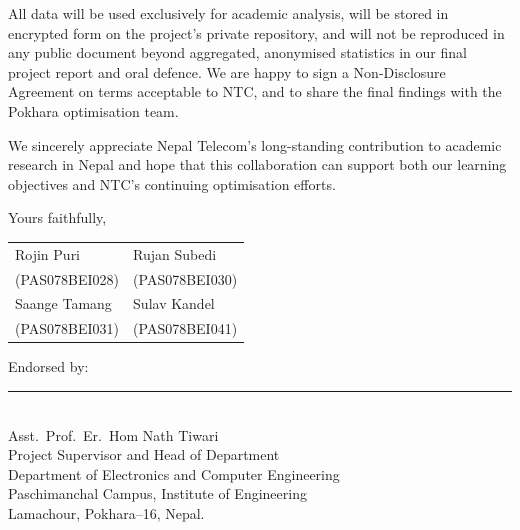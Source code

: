 \documentclass[12pt,a4paper,oneside]{report}
\begin{document}
All data will be used exclusively for academic analysis, will be
stored in encrypted form on the project's private repository, and will
not be reproduced in any public document beyond aggregated, anonymised
statistics in our final project report and oral defence. We are happy
to sign a Non-Disclosure Agreement on terms acceptable to NTC, and to
share the final findings with the Pokhara optimisation team.

We sincerely appreciate Nepal Telecom's long-standing contribution to
academic research in Nepal and hope that this collaboration can support
both our learning objectives and NTC's continuing optimisation efforts.

\vspace{0.6cm}
\noindent Yours faithfully,

\vspace{0.6cm}
\begin{tabular}{p{6cm}p{6cm}}
Rojin Puri \dotfill   & Rujan Subedi \dotfill \\[0.5cm]
(PAS078BEI028)        & (PAS078BEI030) \\[0.6cm]
Saange Tamang \dotfill & Sulav Kandel \dotfill \\[0.5cm]
(PAS078BEI031)        & (PAS078BEI041) \\
\end{tabular}

\vspace{0.6cm}
\noindent Endorsed by:\\[0.4cm]
\noindent\rule{6cm}{0.5pt}\\
Asst.\ Prof.\ Er.\ Hom Nath Tiwari\\
Project Supervisor and Head of Department\\
Department of Electronics and Computer Engineering\\
Paschimanchal Campus, Institute of Engineering\\
Lamachour, Pokhara--16, Nepal.
\end{document}
